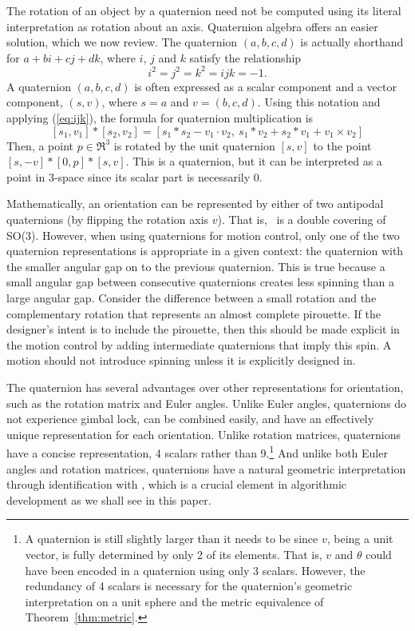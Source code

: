 The rotation of an object by a quaternion need not be 
computed using its literal interpretation as rotation about an axis.
Quaternion algebra offers an easier solution, which we now review.
The quaternion $(a,b,c,d)$ is actually shorthand for $a + bi + cj + dk$,
where $i$, $j$ and $k$ satisfy the relationship 
\begin{equation}
\label{eq:ijk}
	i^2 = j^2 = k^2 = ijk = -1. 
\end{equation}
A quaternion $(a,b,c,d)$ is often expressed as a scalar component
and a vector component, $(s,v)$, where $s=a$ and $v=(b,c,d)$.
Using this notation and applying (\ref{eq:ijk}),
the formula for quaternion multiplication is
\begin{equation}
\label{eq:qmult}
	[s_1,v_1] * [s_2,v_2] =
	[s_1*s_2 - v_1 \cdot v_2,\ 
	 s_1 * v_2 + s_2 * v_1 + v_1 \times v_2]
\end{equation}
Then, a point $p \in \Re^3$ is rotated by the unit quaternion $[s,v]$
to the point $[s,-v] * [0,p] * [s,v]$.
This is a quaternion, but it can be interpreted
as a point in 3-space since its scalar part is necessarily 0.

Mathematically, an orientation can be represented by either of two antipodal quaternions
(by flipping the rotation axis $v$).
That is, \ is a double covering of SO(3).
However, when using quaternions for motion control, only one of the two
quaternion representations is appropriate in a given context:
the quaternion with the smaller angular gap on  to the previous quaternion.
This is true because a small angular gap between consecutive quaternions
creates less spinning than a large angular gap.
Consider the difference between a small rotation and the complementary
rotation that represents an almost complete pirouette.
If the designer's intent is to include the pirouette, then this should be
made explicit in the motion control by adding intermediate quaternions
that imply this spin.
A motion should not introduce spinning unless it is explicitly designed in.

The quaternion has several advantages over other representations
for orientation, such as the rotation matrix and Euler angles.
Unlike Euler angles, quaternions do not experience gimbal lock,
can be combined easily, and have an effectively unique representation
for each orientation.
Unlike rotation matrices, quaternions have a concise representation,
4 scalars rather than 9.\footnote{A quaternion is still slightly 
	larger than it needs to be since $v$, being a unit vector, 
	is fully determined by only 2 of its elements.
	That is, $v$ and $\theta$ could have been encoded in 
	a quaternion using only 3 scalars.
	However, the redundancy of 4 scalars is necessary for
	the quaternion's geometric interpretation on a unit sphere 
	and the metric equivalence of Theorem~\ref{thm:metric}.}
And unlike both Euler angles and rotation matrices, 
quaternions have a natural geometric interpretation through identification
with \Sn{3}, which is a crucial element in algorithmic
development as we shall see in this paper.

